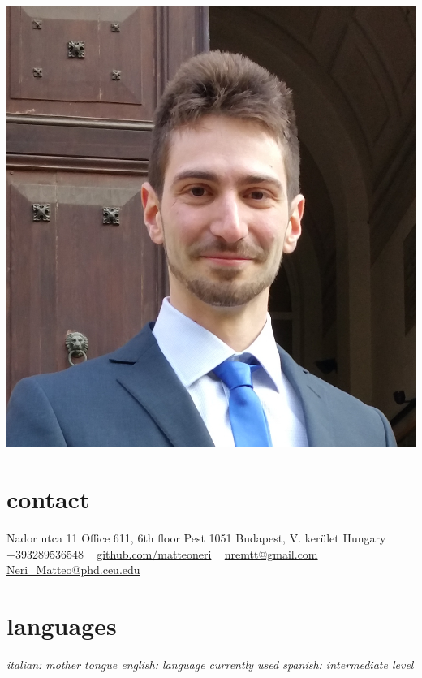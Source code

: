 \documentclass[]{cv-style}     %
\begin{document}
\lastupdated

\begin{aside}
\includegraphics[scale=0.08]{profile.jpeg}
%
\section{contact}
Nador utca 11
Office 611, 6th floor
Pest 1051
Budapest, V. ker\"ulet
Hungary
~
+393289536548
~
\href{https://github.com/matteoneri}{github.com/matteoneri}
~
\href{mailto:nremtt@gmail.com}{nremtt@gmail.com}
\href{mailto:Neri_Matteo@phd.ceu.edu}{Neri\_Matteo@phd.ceu.edu}
%
\section{languages}
\it{italian}: mother tongue
\it{english}: language currently used
\it{spanish}: intermediate level
\end{aside}
\end{document}
